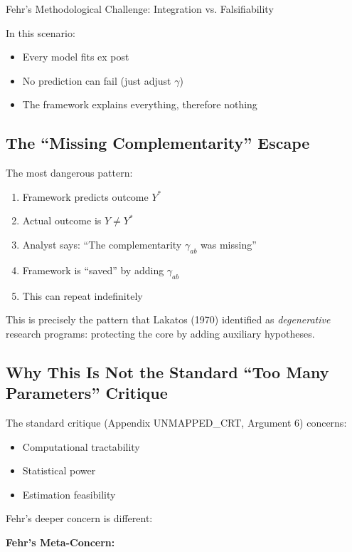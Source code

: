 \begin{chapter}{Fehr's Methodological Challenge: Integration vs. Falsifiability}
\begin{tcolorbox}[colback=red!10!white,colframe=red!75!black,title=\textbf{Fehr's Nightmare}]
In this scenario:
\begin{itemize}[noitemsep]
    \item Every model fits ex post
    \item No prediction can fail (just adjust $\gamma$)
    \item The framework explains everything, therefore nothing
\end{itemize}
\end{tcolorbox}

\subsection{The ``Missing Complementarity'' Escape}

The most dangerous pattern:

\begin{enumerate}
    \item Framework predicts outcome $Y^*$
    \item Actual outcome is $Y \neq Y^*$
    \item Analyst says: ``The complementarity $\gamma_{ab}$ was missing''
    \item Framework is ``saved'' by adding $\gamma_{ab}$
    \item This can repeat indefinitely
\end{enumerate}

This is precisely the pattern that Lakatos (1970) identified as \textit{degenerative} research programs: protecting the core by adding auxiliary hypotheses.

\subsection{Why This Is Not the Standard ``Too Many Parameters'' Critique}

The standard critique (Appendix UNMAPPED_CRT, Argument 6) concerns:
\begin{itemize}[noitemsep]
    \item Computational tractability
    \item Statistical power
    \item Estimation feasibility
\end{itemize}

Fehr's deeper concern is different:

\begin{tcolorbox}[colback=gray!10!white,colframe=gray!75!black]
\textbf{Fehr's Meta-Concern:}


\end{tcolorbox}
\end{chapter}
